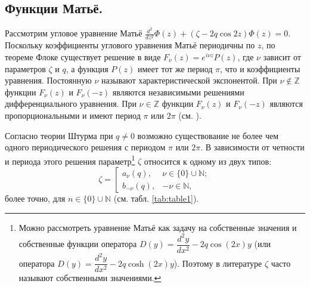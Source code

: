 \subsection{Функции Матьё.}\label{sec:ch1/sec3/sub1}
Рассмотрим угловое уравнение Матьё $\frac{d^2}{d z^2}\Phi(z) + (\zeta - 2q\cos{2 z})\Phi(z) =0$. 
Поскольку коэффициенты углового уравнения Матьё периодичны по $z$, по теореме Флоке \cite{wref2} существует решение в виде $F_\nu(z) = e^{i\nu z}P(z)$, где $\nu$ зависит от параметров $\zeta$ и $q$, а функция $P(z)$ имеет тот же период $\pi$, что и коэффициенты уравнения. Постоянную $\nu$ называют характеристической экспонентой. При $\nu \notin \mathbb{Z}$ функции $F_\nu(z)$ и $F_\nu(-z)$ являются независимыми решениями дифференциального уравнения. При $\nu \in \mathbb{Z}$ функции $F_\nu(z)$ и $F_\nu(-z)$ являются пропорциональными и имеют период $\pi$ или $2 \pi$ (см. \cite{wref2}).


Согласно теории Штурма при $q \neq 0$ возможно существование не более чем одного периодического решения с периодом $\pi$ или $2 \pi$. В зависимости от четности и периода этого решения параметр\footnote[2]{
		Можно рассмотреть уравнение Матьё как задачу на собственные значения и собственные функции оператора $D(y) = \dfrac{d^2y}{dx^2} - 2q\cos(2x) y$ (или оператора $D(y) = \dfrac{d^2y}{dx^2} - 2q\cosh(2x) y$). Поэтому в литературе  $\zeta$ часто называют собственными значениями.
}   $\zeta$ относится к одному из двух типов:
\[
\zeta = \left[
\begin{array}{cccc}
	a_\nu(q), 					& \nu \in \{0\} \cup \mathbb{N}; \\
	b_{-\nu}(q), 					& -\nu \in \mathbb{N},
\end{array}
\right.
\]
более точно, для $n\in\{0\}\cup\mathbb{N}$ (см. табл. \ref{tab:table1}).



